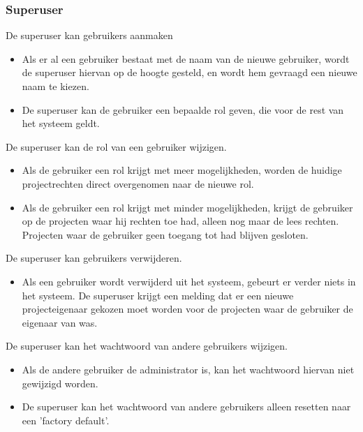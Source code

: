 \subsubsection{Superuser}

De superuser kan gebruikers aanmaken
\begin{itemize}
	\item Als er al een gebruiker bestaat met de naam van de nieuwe gebruiker, wordt de superuser hiervan op de hoogte gesteld, en wordt hem gevraagd een nieuwe naam te kiezen.
	\item De superuser kan de gebruiker een bepaalde rol geven, die voor de rest van het systeem geldt.
\end{itemize}

De superuser kan de rol van een gebruiker wijzigen.
\begin{itemize}
	\item Als de gebruiker een rol krijgt met meer mogelijkheden, worden de huidige projectrechten direct overgenomen naar de nieuwe rol.
	\item Als de gebruiker een rol krijgt met minder mogelijkheden, krijgt de gebruiker op de projecten waar hij rechten toe had, alleen nog maar de lees rechten. Projecten waar de gebruiker geen toegang tot had blijven gesloten.
\end{itemize}

De superuser kan gebruikers verwijderen.
\begin{itemize}
	\item Als een gebruiker wordt verwijderd uit het systeem, gebeurt er verder niets in het systeem. De superuser krijgt een melding dat er een nieuwe projecteigenaar gekozen moet worden voor de projecten waar de gebruiker de eigenaar van was.
\end{itemize}

De superuser kan het wachtwoord van andere gebruikers wijzigen.
\begin{itemize}
	\item Als de andere gebruiker de administrator is, kan het wachtwoord hiervan niet gewijzigd worden.
	\item De superuser kan het wachtwoord van andere gebruikers alleen resetten naar een 'factory default'.
\end{itemize}